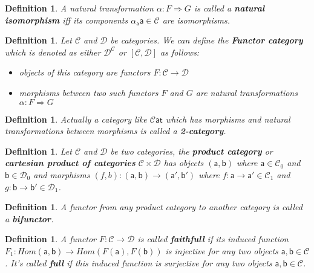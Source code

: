 \documentclass{article}
\newcommand{\cat}[1]{\mathcal{#1}} %
\newcommand{\cato}[1]{\cat{#1}_0} %
\newcommand{\catm}[1]{\cat{#1}_1} %
\newcommand{\ob}[1]{\mathsf{#1}} %
\newcommand{\scat}{\cat{C}\ob{at}}
\newtheorem{definition}[theorem]{Definition}
\begin{document}
\begin{definition}
	A natural transformation $\alpha: F \Rightarrow G$ is called a \textbf{natural isomorphism} iff its components $\alpha_{\ob{a}} \ob{a} \in \cat{C}$ are isomorphisms.
\end{definition}

\begin{definition}
	Let $\cat{C}$ and $\cat{D}$ be categories. We can define the \textbf{Functor category} which is denoted as either $\cat{D}^{\cat{C}}$ or $[\cat{C}, \cat{D}]$ as follows:
	\begin{itemize}
		\item objects of this category are functors $F: \cat{C} \rightarrow \cat{D}$
		\item morphisms between two such functors $F$ and $G$ are natural transformations $\alpha: F \Rightarrow G$
	\end{itemize}
\end{definition}

\begin{definition}
	Actually a category like $\scat$ which has morphisms and natural transformations between morphisms is called a \textbf{2-category}.
\end{definition}

\begin{definition}
	Let $\cat{C}$ and $\cat{D}$ be two categories, the \textbf{product category} or \textbf{cartesian product of categories} $\cat{C} \times \cat{D}$ has objects $(\ob{a}, \ob{b})$
	where $\ob{a} \in \cato{C}$ and $\ob{b} \in \cato{D}$ and morphisms $(f,b): (\ob{a}, \ob{b}) \rightarrow (\ob{a'}, \ob{b'})$ where $f: \ob{a} \rightarrow \ob{a'} \in \catm{C}$ and $g: \ob{b} \rightarrow \ob{b'} \in \catm{D}$.
\end{definition}

\begin{definition}
	A functor from any product category to another category is called a \textbf{bifunctor}.
\end{definition}

\begin{definition}
	A functor $F: \cat{C} \rightarrow \cat{D}$ is called \textbf{faithfull} if its induced function $F_1: Hom(\ob{a}, \ob{b}) \rightarrow Hom(F(\ob{a}), F(\ob{b}))$ is injective for any two objects $\ob{a}, \ob{b} \in \cat{C}$.
	It's called \textbf{full} if this induced function is surjective for any two objects $\ob{a}, \ob{b} \in \cat{C}$.
\end{definition}
\end{document}

